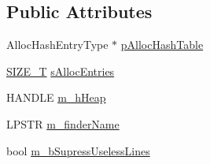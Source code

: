 \subsection*{Public Attributes}
\begin{DoxyCompactItemize}
\item 
Alloc\-Hash\-Entry\-Type $\ast$ \hyperlink{class_context_hashtable_base_a22aba6b9cc816a9c69820dae9e06e5e2}{p\-Alloc\-Hash\-Table}
\item 
\hyperlink{_stack_walker_8h_abf8e46e57d5b85295601cefa33de3b7a}{S\-I\-Z\-E\-\_\-\-T} \hyperlink{class_context_hashtable_base_acf5c9250de4fab9142480d651f0cd421}{s\-Alloc\-Entries}
\item 
H\-A\-N\-D\-L\-E \hyperlink{class_context_hashtable_base_abd63115983bd666ee0cb09bc684ada65}{m\-\_\-h\-Heap}
\item 
L\-P\-S\-T\-R \hyperlink{class_context_hashtable_base_ab01c5068209ba7f43ee1f8670f79c837}{m\-\_\-finder\-Name}
\item 
bool \hyperlink{class_context_hashtable_base_a5cfe6a5ef2651d399a5b5a9b7d4f2b3d}{m\-\_\-b\-Supress\-Useless\-Lines}
\end{DoxyCompactItemize}
